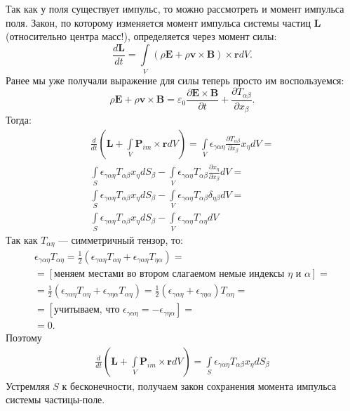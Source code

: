 \documentclass[a4paper,14pt]{extreport} %
\newcommand{\dff}[2]{\frac{\partial #1}{\partial #2}}
\newcommand{\Df}[1]{\frac{d}{d #1}}
\newcommand{\Dff}[2]{\frac{d #1}{d #2}}
\renewcommand{\vec}[1]{\boldsymbol{#1}}
\newcommand{\eps}{\varepsilon}
\begin{document}
	Так как у поля существует импульс, то можно рассмотреть и момент импульса поля. Закон, по которому изменяется момент импульса системы частиц $\vec{L}$ (относительно центра масс!), определяется через момент силы:
	\begin{equation*}
		\Dff{\vec{L}}{t} =
		\int\limits_{V} (\rho \vec{E} + \rho \vec{v}\times\vec{B} )\times \vec{r} dV.
	\end{equation*}
	Ранее мы уже получали выражение для силы теперь просто им воспользуемся:
	\begin{equation*}
		\rho \vec{E} + \rho \vec{v}\times\vec{B} = 
		\eps_0 \dff{\vec{E}\times\vec{B}}{t} + \dff{T_{\alpha\beta}}{x_\beta}.
	\end{equation*}
	Тогда:
	\begin{equation*}
	\begin{gathered}
	\Df{t} \left(\vec{L} + \int\limits_{V} \vec{P}_{im}\times\vec{r} dV\right) =
	\int\limits_{V} \epsilon_{\gamma\alpha\eta} \dff{T_{\alpha\beta}}{x_\beta} x_\eta dV = \\
	\int\limits_{S} \epsilon_{\gamma\alpha\eta} T_{\alpha\beta} x_\eta dS_\beta -
	\int\limits_{V} \epsilon_{\gamma\alpha\eta} T_{\alpha\beta}\dff{x_\eta}{x_\beta} dV = \\
	\int\limits_{S} \epsilon_{\gamma\alpha\eta} T_{\alpha\beta} x_\eta dS_\beta -
	\int\limits_{V} \epsilon_{\gamma\alpha\eta} T_{\alpha\beta}\delta_{\eta\beta} dV = \\
	\int\limits_{S} \epsilon_{\gamma\alpha\eta} T_{\alpha\beta} x_\eta dS_\beta -
	\int\limits_{V} \epsilon_{\gamma\alpha\eta} T_{\alpha\eta} dV
	\end{gathered}
	\end{equation*}
	Так как $T_{\alpha\eta}$ --- симметричный тензор, то:
	\begin{equation*}
		\begin{gathered}
		\epsilon_{\gamma\alpha\eta} T_{\alpha\eta} = \frac{1}{2} (\epsilon_{\gamma\alpha\eta} T_{\alpha\eta} + \epsilon_{\gamma\alpha\eta} T_{\eta\alpha}) = \\ 
		= [\text{меняем местами во втором слагаемом немые индексы $\eta$ и $\alpha$}] =  \\ = \frac{1}{2} (\epsilon_{\gamma\alpha\eta} T_{\alpha\eta} + \epsilon_{\gamma\eta\alpha} T_{\alpha\eta}) = \frac{1}{2} (\epsilon_{\gamma\alpha\eta}+ \epsilon_{\gamma\eta\alpha} ) T_{\alpha\eta} = \\ =
		[\text{учитываем, что $\epsilon_{\gamma\alpha\eta} = - \epsilon_{\gamma\eta\alpha}$}] = \\
		= 0.
		\end{gathered}
	\end{equation*}
	Поэтому
	\begin{equation*}
	\begin{gathered}
	\Df{t} \left(\vec{L} + \int\limits_{V} \vec{P}_{im}\times\vec{r} dV\right) =
	\int\limits_{S} \epsilon_{\gamma\alpha\eta} T_{\alpha\beta} x_\eta dS_\beta
	\end{gathered}
	\end{equation*}
	Устремляя $S$ к бесконечности, получаем закон сохранения момента импульса системы частицы-поле.
	
\end{document}
